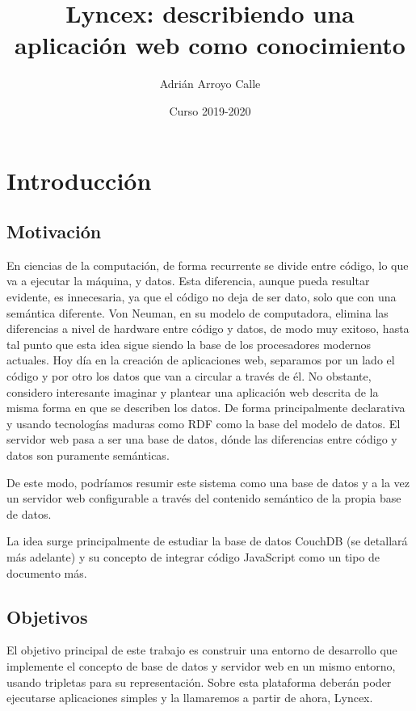 \documentclass[12pt]{report} %
\title{Lyncex: describiendo una aplicación web como conocimiento}
\author{Adrián Arroyo Calle}
\date{Curso 2019-2020}
\begin{document}
\maketitle

\tableofcontents

\listoffigures

\listoftables

\chapter{Introducción}

\section{Motivación}

En ciencias de la computación, de forma recurrente se divide entre código, lo que va a ejecutar la máquina, y datos.
Esta diferencia, aunque pueda resultar evidente, es innecesaria, ya que el código no deja de ser dato, solo que con una semántica diferente.
Von Neuman, en su modelo de computadora, elimina las diferencias a nivel de hardware entre código y datos, de modo muy exitoso, hasta tal punto que esta idea sigue siendo la base de los procesadores modernos actuales.
Hoy día en la creación de aplicaciones web, separamos por un lado el código y por otro los datos que van a circular a través de él. 
No obstante, considero interesante imaginar y plantear una aplicación web descrita de la misma forma en que se describen los datos.
De forma principalmente declarativa y usando tecnologías maduras como RDF como la base del modelo de datos.
El servidor web pasa a ser una base de datos, dónde las diferencias entre código y datos son puramente semánticas.

De este modo, podríamos resumir este sistema como una base de datos y a la vez un servidor web configurable a través del contenido semántico de la propia base de datos.

La idea surge principalmente de estudiar la base de datos CouchDB (se detallará más adelante) y su concepto de integrar código JavaScript como un tipo de documento más.

\section{Objetivos}

El objetivo principal de este trabajo es construir una entorno de desarrollo que implemente el concepto de base de datos y servidor web en un mismo entorno, usando tripletas para su representación. Sobre esta plataforma deberán poder ejecutarse aplicaciones simples y la llamaremos a partir de ahora, Lyncex.
\end{document}
